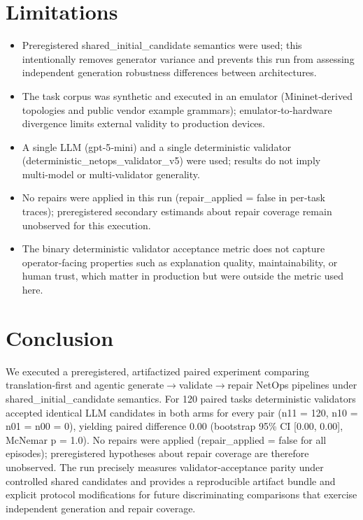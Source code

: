 \documentclass[conference]{IEEEtran}
\begin{document}
\section{Limitations}
\begin{itemize}
\item Preregistered shared\_initial\_candidate semantics were used; this intentionally removes generator variance and prevents this run from assessing independent generation robustness differences between architectures.
\item The task corpus was synthetic and executed in an emulator (Mininet‑derived topologies and public vendor example grammars); emulator‑to‑hardware divergence limits external validity to production devices.
\item A single LLM (gpt‑5‑mini) and a single deterministic validator (deterministic\_netops\_validator\_v5) were used; results do not imply multi‑model or multi‑validator generality.
\item No repairs were applied in this run (repair\_applied = false in per‑task traces); preregistered secondary estimands about repair coverage remain unobserved for this execution.
\item The binary deterministic validator acceptance metric does not capture operator‑facing properties such as explanation quality, maintainability, or human trust, which matter in production but were outside the metric used here.
\end{itemize}

\section{Conclusion}
We executed a preregistered, artifactized paired experiment comparing translation‑first and agentic generate\ensuremath{\rightarrow}validate\ensuremath{\rightarrow}repair NetOps pipelines under shared\_initial\_candidate semantics. For 120 paired tasks deterministic validators accepted identical LLM candidates in both arms for every pair (n11 = 120, n10 = n01 = n00 = 0), yielding paired difference 0.00 (bootstrap 95\% CI [0.00, 0.00], McNemar p = 1.0). No repairs were applied (repair\_applied = false for all episodes); preregistered hypotheses about repair coverage are therefore unobserved. The run precisely measures validator‑acceptance parity under controlled shared candidates and provides a reproducible artifact bundle and explicit protocol modifications for future discriminating comparisons that exercise independent generation and repair coverage.
\end{document}
